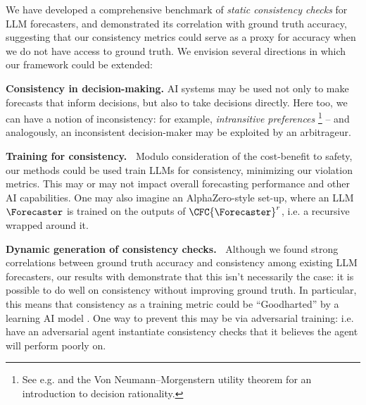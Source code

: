 We have developed a comprehensive benchmark of \emph{static consistency checks} for LLM forecasters, and demonstrated its correlation with ground truth accuracy, suggesting that our consistency metrics could serve as a proxy for accuracy when we do not have access to ground truth. We envision several directions in which our framework could be extended:

\textbf{Consistency in decision-making.} AI systems may be used not only to make forecasts that inform decisions, but also to take decisions directly. Here too, we can have a notion of inconsistency: for example, \emph{intransitive preferences}
\footnote{See e.g. \citet{fishburnUtilityTheoryDecision1970} and the Von Neumann–Morgenstern utility theorem for an introduction to decision rationality.} -- and analogously, an inconsistent decision-maker may be exploited by an arbitrageur.

\textbf{Training for consistency.~}
Modulo consideration of the cost-benefit to safety,
our methods could be used train LLMs for consistency,
minimizing our violation metrics.
This may or may not impact overall forecasting performance and other AI capabilities.
One may also imagine an AlphaZero-style set-up, where an LLM $\Forecaster$ is trained on the outputs of $\CFC{\Forecaster}^r$, i.e. a recursive \CFCaster{} wrapped around it.


\textbf{Dynamic generation of consistency checks.~}
Although we found strong correlations between ground truth accuracy and consistency among existing LLM forecasters, our results with \CFCaster{} demonstrate that this isn't necessarily the case: it is possible to do well on consistency without improving ground truth. In particular, this means that consistency as a training metric could be ``Goodharted'' by a learning AI model \citep{karwowskiGoodhartsLawReinforcement2023}. One way to prevent this may be via adversarial training: i.e. have an adversarial agent instantiate consistency checks that it believes the agent will perform poorly on.

